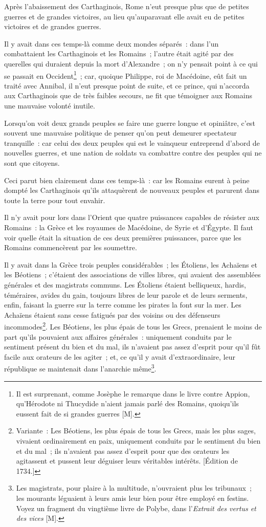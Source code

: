 \documentclass[french,twoside]{book} %
\begin{document}
Après l’abaissement des Carthaginois, Rome n’eut presque plus que de petites guerres et de grandes victoires, au lieu qu’auparavant elle avait eu de petites victoires et de grandes guerres.\par
Il y avait dans ces temps-là comme deux mondes séparés : dans l’un combattaient les Carthaginois et les Romains ; l’autre était agité par des querelles qui duraient depuis la mort d’Alexandre ; on n’y pensait point à ce qui se passait en Occident\footnote{Il est surprenant, comme Josèphe le remarque dans le livre contre Appion, qu’Hérodote ni Thucydide n’aient jamais parlé des Romains, quoiqu’ils eussent fait de si grandes guerres [M].} ; car, quoique Philippe, roi de Macédoine, eût fait un traité avec Annibal, il n’eut presque point de suite, et ce prince, qui n’accorda aux Carthaginois que de très faibles secours, ne fit que témoigner aux Romains une mauvaise volonté inutile.\par
Lorsqu’on voit deux grands peuples se faire une guerre longue et opiniâtre, c’est souvent une mauvaise politique de penser qu’on peut demeurer spectateur tranquille : car celui des deux peuples qui est le vainqueur entreprend d’abord de nouvelles guerres, et une nation de soldats va combattre contre des peuples qui ne sont que citoyens.\par
Ceci parut bien clairement dans ces temps-là : car les Romains eurent à peine dompté les Carthaginois qu’ils attaquèrent de nouveaux peuples et parurent dans toute la terre pour tout envahir.\par
Il n’y avait pour lors dans l’Orient que quatre puissances capables de résister aux Romains : la Grèce et les royaumes de Macédoine, de Syrie et d’Égypte. Il faut voir quelle était la situation de ces deux premières puissances, parce que les Romains commencèrent par les soumettre.\par
Il y avait dans la Grèce trois peuples considérables ; les Étoliens, les Achaïens et les Béotiens ; c’étaient des associations de villes libres, qui avaient des assemblées générales et des magistrats communs. Les Étoliens étaient belliqueux, hardis, téméraires, avides du gain, toujours libres de leur parole et de leurs serments, enfin, faisant la guerre sur la terre comme les pirates la font sur la mer. Les Achaïens étaient sans cesse fatigués par des voisins ou des défenseurs incommodes\footnote{Variante : Les Béotiens, les plus épais de tous les Grecs, mais les plus sages, vivaient ordinairement en paix, uniquement conduits par le sentiment du bien et du mal ; ils n’avaient pas assez d’esprit pour que des orateurs les agitassent et pussent leur déguiser leurs véritables intérêts. [Édition de 1734.]}. Les Béotiens, les plus épais de tous les Grecs, prenaient le moins de part qu’ils pouvaient aux affaires générales : uniquement conduits par le sentiment présent du bien et du mal, ils n’avaient pas assez d’esprit pour qu’il fût facile aux orateurs de les agiter ; et, ce qu’il y avait d’extraordinaire, leur république se maintenait dans l’anarchie même\footnote{Les magistrats, pour plaire à la multitude, n’ouvraient plus les tribunaux ; les mourants léguaient à leurs amis leur bien pour être employé en festins. Voyez un fragment du vingtième livre de Polybe, dans l’{\itshape Extrait des vertus et des vices} [M].}.\par
\end{document}
